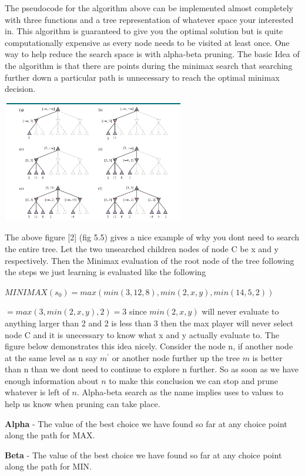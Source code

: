 The pseudocode for the algorithm above can be implemented almost completely with three functions and a tree representation of whatever space your interested in. This algorithm is guaranteed to give you the optimal solution but is quite computationally expensive as every node needs to be visited at least once. One way to help reduce the search space is with alpha-beta pruning. The basic Idea of the algorithm is that there are points during the minimax search that searching further down a particular path is unnecessary to reach the optimal minimax decision. 

\includegraphics[width=300px,height=200px]{images/alpha_beta_figure.png}

The above figure [2] (fig 5.5) gives a nice example of why you dont need to search the entire tree. Let the two unsearched children nodes of node C be x and y respectively. Then the Minimax evaluation of the root node of the tree following the steps we just learning is evaluated like the following 

$ MINIMAX(s_{0}) = max(min(3,12,8), min(2,x,y), min(14,5,2)) $

$ = max(3,min(2,x,y),2) = 3 $ since $ min(2,x,y)$ will never evaluate to anything larger than 2 and 2 is less than 3 then the max player will never select node C and it is unecessary to know what x and y actually evaluate to. The figure below demonstrates this idea nicely. Consider the node n, if another node at the same level as n say $ m^{'}$ or another node further up the tree $m$ is better than n than we dont need to continue to explore n further. So as soon as we have enough information about $n$ to make this conclusion we can stop and prune whatever is left of $n$. Alpha-beta search as the name implies uses to values to help us know when pruning can take place.

\textbf{Alpha} - The value of the best choice we have found so far at any choice point along the path for MAX. 

\textbf{Beta} - The value of the best choice we have found so far at any choice point along the path for MIN. 

